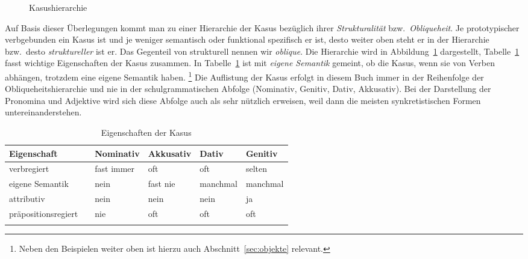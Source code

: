 \begin{exe}
\end{exe}

\begin{figure}[!htbp]
  \centering
  \caption{Kasushierarchie}
  \label{fig:kashier}
\end{figure}

Auf Basis dieser Überlegungen kommt man zu einer Hierarchie der Kasus bezüglich ihrer \textit{Strukturalität} bzw.\ \textit{Obliqueheit}.
Je prototypischer verbgebunden ein Kasus ist und je weniger semantisch oder funktional spezifisch er ist, desto weiter oben steht er in der Hierarchie bzw.\ desto \textit{struktureller} ist er.
Das Gegenteil von strukturell nennen wir \textit{oblique}.
Die Hierarchie wird in Abbildung~\ref{fig:kashier} dargestellt, Tabelle~\ref{tab:eigenschaftenderkasus} fasst wichtige Eigenschaften der Kasus zusammen.
In Tabelle~\ref{tab:eigenschaftenderkasus} ist mit \textit{eigene Semantik} gemeint, ob die Kasus, wenn sie von Verben abhängen, trotzdem eine eigene Semantik haben.%
\footnote{Neben den Beispielen weiter oben ist hierzu auch Abschnitt~\ref{sec:objekte} relevant.}
Die Auflistung der Kasus erfolgt in diesem Buch immer in der Reihenfolge der Obliqueheitshierarchie und nie in der schulgrammatischen Abfolge (Nominativ, Genitiv, Dativ, Akkusativ).
Bei der Darstellung der Pronomina und Adjektive wird sich diese Abfolge auch als sehr nützlich erweisen, weil dann die meisten synkretistischen Formen untereinanderstehen.

\begin{table}[!htbp]
  \begin{tabular}{lp{0.1cm}llll}
    \lsptoprule
     \textbf{Eigenschaft} && \textbf{Nominativ} & \textbf{Akkusativ} & \textbf{Dativ} & \textbf{Genitiv} \\
    \hline
    verbregiert && fast immer & oft & oft & selten \\
    eigene Semantik && nein & fast nie & manchmal & manchmal \\
    attributiv && nein & nein & nein & ja \\
    präpositionsregiert && nie & oft & oft & oft \\
    \lspbottomrule
  \end{tabular}
  \caption{Eigenschaften der Kasus}
  \label{tab:eigenschaftenderkasus}
\end{table}

